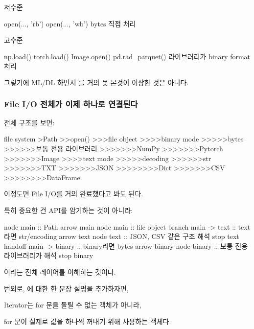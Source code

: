 \begin{dhksmry}[centered]
저수준

open(..., 'rb')
open(..., 'wb')
\da
bytes 직접 처리



고수준

np.load()
torch.load()
Image.open()
pd.rad_parquet()
\da
라이브러리가 binary format 처리
\end{dhksmry}

그렇기에 ML/DL 하면서 를 거의 못 본것이 이상한 것은 아니다.

\subsubsection{File I/O 전체가 이제 하나로 연결된다}

전체 구조를 보면:

\begin{dhktree}
file system
>Path
>>open()
>>>file object
>>>>binary mode
>>>>>bytes
>>>>>>보통 전용 라이브러리
>>>>>>>NumPy
>>>>>>>Pytorch
>>>>>>>Image
>>>>text mode
>>>>>decoding
>>>>>>str
>>>>>>>TXT
>>>>>>>JSON
>>>>>>>>Dict
>>>>>>>CSV
>>>>>>>>DataFrame
\end{dhktree}

이정도면 File I/O를 거의 완료했다고 봐도 된다.

특히 중요한 건 API를 암기하는 것이 아니라:

\begin{dhkbranch}[in=8]
node main :: Path
arrow main
node main :: file object
branch main -> text :: text라면 str/encoding
arrow text
node text :: JSON, CSV 같은 구조 해석
stop text
handoff main -> binary :: binary라면 bytes
arrow binary
node binary :: 보통 전용 라이브러리가 해석
stop binary
\end{dhkbranch}

이라는 전체 레이어를 이해하는 것이다.

\begin{dhknote}
\begin{dhksmry}
    번외로, 에 대한 한 문장 설명을 추가하자면,

    Iterator는 for 문을 돌릴 수 없는 객체가 아니라, 

    for 문이 실제로 값을 하나씩 꺼내기 위해 사용하는 객체다.
\end{dhksmry}
\end{dhknote}
